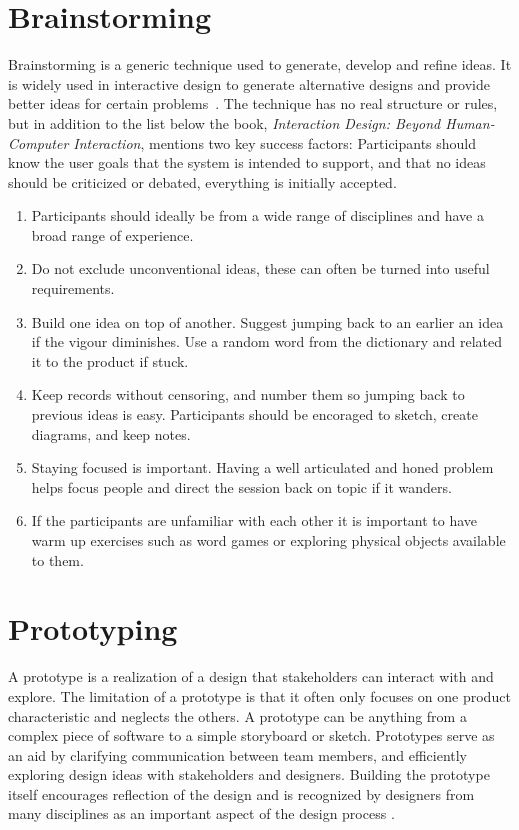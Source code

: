 \section{Brainstorming}
\label{sec:brainstorming}
Brainstorming is a generic technique used to generate, develop and refine ideas. It is widely used in interactive design to generate alternative designs and provide better ideas for certain problems~\cite{interactionDesign}. The technique has no real structure or rules, but in addition to the list below the book, \textit{Interaction Design: Beyond Human-Computer Interaction}, mentions two key success factors: Participants should know the user goals that the system is intended to support, and that no ideas should be criticized or debated, everything is initially accepted.

\begin{enumerate}
  \item Participants should ideally be from a wide range of disciplines and have a broad range of experience.
  \item Do not exclude unconventional ideas, these can often be turned into useful requirements.
  \item Build one idea on top of another. Suggest jumping back to an earlier an idea if the vigour diminishes. Use a random word from the dictionary and related it to the product if stuck.
  \item Keep records without censoring, and number them so jumping back to previous ideas is easy. Participants should be encoraged to sketch, create diagrams, and keep notes.
  \item Staying focused is important. Having a well articulated and honed problem helps focus people and direct the session back on topic if it wanders.
  \item If the participants are unfamiliar with each other it is important to have warm up exercises such as word games or exploring physical objects available to them.
\end{enumerate}

\section{Prototyping}
A prototype is a realization of a design that stakeholders can interact with and explore. The limitation of a prototype is that it often only focuses on one product characteristic and neglects the others. A prototype can be anything from a complex piece of software to a simple storyboard or sketch. Prototypes serve as an aid by clarifying communication between team members, and efficiently exploring design ideas with stakeholders and designers. Building the prototype itself encourages reflection of the design and is recognized by designers from many disciplines as an important aspect of the design process \cite{interactionDesign}.

